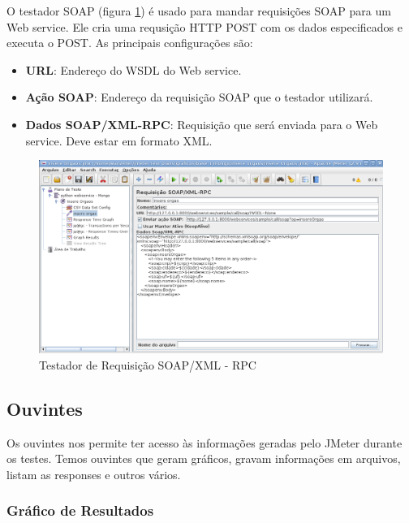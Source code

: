 O testador SOAP (figura \ref{fig:testador_insere_orgao}) é usado para mandar requisições SOAP para um Web service.  Ele cria uma requsição HTTP POST com os dados especificados e executa o POST.  As principais configurações são:


\begin{itemize}
\item \textbf{URL}:  Endereço do WSDL do Web service.
\item \textbf{Ação SOAP}: Endereço da requisição SOAP que o testador utilizará.
\item \textbf{Dados SOAP/XML-RPC}: Requisição que será enviada para o Web service. Deve estar em formato XML.
\end{itemize}

	\begin{figure}[!htbp]
		\begin{center}
			\includegraphics[width=1\textwidth]{testador_insere_orgao}
		\end{center}
		\caption{Testador de Requisição SOAP/XML - RPC}
		\label{fig:testador_insere_orgao}
	\end{figure}

\subsection{Ouvintes}

Os ouvintes nos permite ter acesso às informações geradas pelo JMeter durante os testes. Temos ouvintes que geram gráficos, gravam informações em arquivos, listam as responses e outros vários.

\subsubsection{Gráfico de Resultados}


